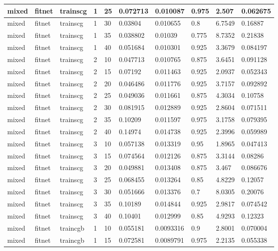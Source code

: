 \begin{longtable}{lllllllll}
mixed & fitnet & trainscg & 1 & 25 & 0.072713 & 0.010087 & 0.975 & 2.507 & 0.062675 \\ \hline 
mixed & fitnet & trainscg & 1 & 30 & 0.03804 & 0.010655 & 0.8 & 6.7549 & 0.16887 \\ \hline 
mixed & fitnet & trainscg & 1 & 35 & 0.038802 & 0.01039 & 0.775 & 8.7352 & 0.21838 \\ \hline 
mixed & fitnet & trainscg & 1 & 40 & 0.051684 & 0.010301 & 0.925 & 3.3679 & 0.084197 \\ \hline 
mixed & fitnet & trainscg & 2 & 10 & 0.047713 & 0.010765 & 0.875 & 3.6451 & 0.091128 \\ \hline 
mixed & fitnet & trainscg & 2 & 15 & 0.07192 & 0.011463 & 0.925 & 2.0937 & 0.052343 \\ \hline 
mixed & fitnet & trainscg & 2 & 20 & 0.046486 & 0.011776 & 0.925 & 3.7157 & 0.092892 \\ \hline 
mixed & fitnet & trainscg & 2 & 25 & 0.049036 & 0.011661 & 0.875 & 4.3034 & 0.10758 \\ \hline 
mixed & fitnet & trainscg & 2 & 30 & 0.081915 & 0.012889 & 0.925 & 2.8604 & 0.071511 \\ \hline 
mixed & fitnet & trainscg & 2 & 35 & 0.10209 & 0.011597 & 0.975 & 3.1758 & 0.079395 \\ \hline 
mixed & fitnet & trainscg & 2 & 40 & 0.14974 & 0.014738 & 0.925 & 2.3996 & 0.059989 \\ \hline 
mixed & fitnet & trainscg & 3 & 10 & 0.057138 & 0.013319 & 0.95 & 1.8965 & 0.047413 \\ \hline 
mixed & fitnet & trainscg & 3 & 15 & 0.074564 & 0.012126 & 0.875 & 3.3144 & 0.08286 \\ \hline 
mixed & fitnet & trainscg & 3 & 20 & 0.049881 & 0.013408 & 0.875 & 3.467 & 0.086676 \\ \hline 
mixed & fitnet & trainscg & 3 & 25 & 0.068455 & 0.013264 & 0.85 & 4.8229 & 0.12057 \\ \hline 
mixed & fitnet & trainscg & 3 & 30 & 0.051666 & 0.013376 & 0.7 & 8.0305 & 0.20076 \\ \hline 
mixed & fitnet & trainscg & 3 & 35 & 0.10189 & 0.014844 & 0.925 & 2.9817 & 0.074542 \\ \hline 
mixed & fitnet & trainscg & 3 & 40 & 0.10401 & 0.012999 & 0.85 & 4.9293 & 0.12323 \\ \hline 
mixed & fitnet & traincgb & 1 & 10 & 0.055181 & 0.0093316 & 0.9 & 2.8001 & 0.070004 \\ \hline 
mixed & fitnet & traincgb & 1 & 15 & 0.072581 & 0.0089791 & 0.975 & 2.2135 & 0.055338 \\ \hline 

\end{longtable}
